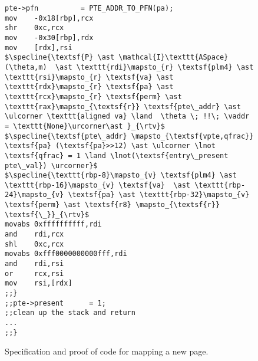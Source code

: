 \begin{figure}
\begin{lstlisting}[mathescape]
pte->pfn          = PTE_ADDR_TO_PFN(pa);
mov    -0x18[rbp],rcx
shr    0xc,rcx
mov    -0x30[rbp],rdx
mov    [rdx],rsi
$\specline{\textsf{P} \ast \mathcal{I}\texttt{ASpace}(\theta,m)  \ast \texttt{rdi}\mapsto_{r} \textsf{plm4} \ast \texttt{rsi}\mapsto_{r} \textsf{va} \ast  \texttt{rdx}\mapsto_{r} \textsf{pa} \ast \texttt{rcx}\mapsto_{r} \textsf{perm} \ast \texttt{rax}\mapsto_{\textsf{r}} \textsf{pte\_addr} \ast \ulcorner \texttt{aligned va} \land  \theta \; !!\; \vaddr = \texttt{None}\urcorner\ast }_{\rtv}$
$\specline{\textsf{pte\_addr} \mapsto_{\textsf{vpte,qfrac}} \textsf{pa} (\textsf{pa}>>12) \ast \ulcorner \lnot \textsf{qfrac} = 1 \land \lnot(\textsf{entry\_present pte\_val}) \urcorner}$     
$\specline{\texttt{rbp-8}\mapsto_{v} \textsf{plm4} \ast \texttt{rbp-16}\mapsto_{v} \textsf{va}  \ast \texttt{rbp-24}\mapsto_{v} \textsf{pa} \ast \texttt{rbp-32}\mapsto_{v} \textsf{perm} \ast \textsf{r8} \mapsto_{\textsf{r}} \textsf{\_}}_{\rtv}$      
movabs 0xffffffffff,rdi
and    rdi,rcx
shl    0xc,rcx
movabs 0xfff0000000000fff,rdi
and    rdi,rsi
or     rcx,rsi
mov    rsi,[rdx]
;;}
;;pte->present      = 1;
;;clean up the stack and return
...
;;}
\end{lstlisting}
  \caption{Specification and proof of code for mapping a new page.}
\label{fig:mapping_code}
\end{figure}

